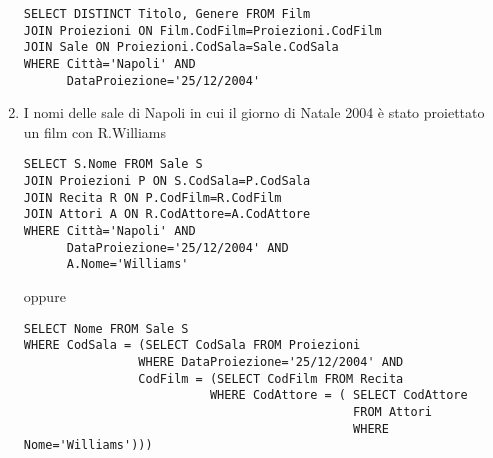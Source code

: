\documentclass[a4paper]{article}
\begin{document}
\begin{enumerate}
\begin{verbatim}
SELECT DISTINCT Titolo, Genere FROM Film
JOIN Proiezioni ON Film.CodFilm=Proiezioni.CodFilm
JOIN Sale ON Proiezioni.CodSala=Sale.CodSala
WHERE Città='Napoli' AND
      DataProiezione='25/12/2004'
\end{verbatim}
\item  I nomi delle sale di Napoli in cui  il giorno di Natale 2004 è stato proiettato un film con R.Williams
\begin{verbatim}
SELECT S.Nome FROM Sale S
JOIN Proiezioni P ON S.CodSala=P.CodSala
JOIN Recita R ON P.CodFilm=R.CodFilm
JOIN Attori A ON R.CodAttore=A.CodAttore
WHERE Città='Napoli' AND
      DataProiezione='25/12/2004' AND
      A.Nome='Williams'
\end{verbatim}
oppure
\begin{verbatim}
SELECT Nome FROM Sale S
WHERE CodSala = (SELECT CodSala FROM Proiezioni
                WHERE DataProiezione='25/12/2004' AND
                CodFilm = (SELECT CodFilm FROM Recita
                          WHERE CodAttore = ( SELECT CodAttore
                                              FROM Attori
                                              WHERE Nome='Williams')))
\end{verbatim}
\end{enumerate}
\end{document}
